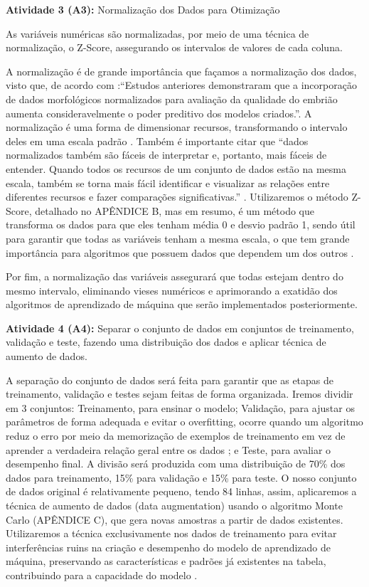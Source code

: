 \textbf{Atividade 3 (A3):} Normalização dos Dados para Otimização

As variáveis numéricas são normalizadas, por meio de uma técnica de normalização, o Z-Score, assegurando os intervalos de valores de cada coluna. 

A normalização é de grande importância que façamos a normalização dos dados, visto que, de acordo com :“Estudos anteriores demonstraram que a incorporação de dados morfológicos normalizados para avaliação da qualidade do embrião aumenta consideravelmente o poder preditivo dos modelos criados.”. A normalização é uma forma de dimensionar recursos, transformando o intervalo deles em uma escala padrão \cite{jaiswal2024}. Também é importante citar que “dados normalizados também são fáceis de interpretar e, portanto, mais fáceis de entender. Quando todos os recursos de um conjunto de dados estão na mesma escala, também se torna mais fácil identificar e visualizar as relações entre diferentes recursos e fazer comparações significativas.” \cite{jaiswal2024}. Utilizaremos o método Z-Score, detalhado no APÊNDICE B, mas em resumo, é um método que transforma os dados para que eles tenham média 0 e desvio padrão 1, sendo útil para garantir que todas as variáveis tenham a mesma escala, o que tem grande importância para algoritmos que possuem dados que dependem um dos outros \cite{jaiswal2024}.

Por fim, a normalização das variáveis assegurará que todas estejam dentro do mesmo intervalo, eliminando vieses numéricos e aprimorando a exatidão dos algoritmos de aprendizado de máquina que serão implementados posteriormente.


\textbf{Atividade 4 (A4):} Separar o conjunto de dados em conjuntos de treinamento, validação e teste, fazendo uma distribuição dos dados e aplicar técnica de aumento de dados.
   
A separação do conjunto de dados será feita para garantir que as etapas de treinamento, validação e testes sejam feitas de forma organizada. Iremos dividir em 3 conjuntos: Treinamento, para ensinar o modelo; Validação, para ajustar os parâmetros de forma adequada e evitar o overfitting, ocorre quando um algoritmo reduz o erro por meio da memorização de exemplos de treinamento em vez de aprender a verdadeira relação geral entre os dados \cite{bashir2020}; e Teste, para avaliar o desempenho final. A divisão será produzida com uma distribuição de 70\% dos dados para treinamento, 15\% para validação e 15\% para teste. O nosso conjunto de dados original é relativamente pequeno, tendo 84 linhas, assim, aplicaremos a técnica de aumento de dados (data augmentation) usando o algoritmo Monte Carlo (APÊNDICE C), que gera novas amostras a partir de dados existentes. Utilizaremos a técnica exclusivamente nos dados de treinamento para evitar interferências ruins na criação e desempenho do modelo de aprendizado de máquina, preservando as características e padrões já existentes na tabela, contribuindo para a capacidade do modelo \cite{kiar2021}. 

